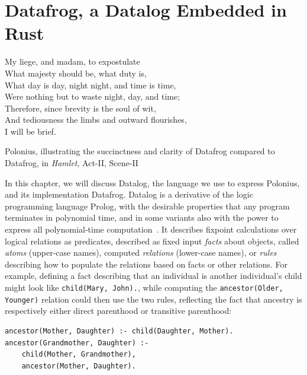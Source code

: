 \documentclass[11pt,a4paper,twoside,openany,draft]{report}
\newcommand{\InDatalog}[1]{\texttt{#1}}
\begin{document}
\chapter{Datafrog, a Datalog Embedded in Rust}\label{cha:datalog}

\epigraph{My liege, and madam, to expostulate\\
  What majesty should be, what duty is,\\
  What day is day, night night, and time is time,\\
  Were nothing but to waste night, day, and time;\\
  Therefore, since brevity is the soul of wit,\\
  And tediousness the limbs and outward flourishes,\\
  I will be brief.}{Polonius, illustrating the succinctness and clarity of
  Datafrog compared to Datafrog, in \textit{Hamlet}, Act-II, Scene-II}

In this chapter, we will discuss Datalog, the language we use to express
Polonius, and its implementation Datafrog. Datalog is a derivative of the logic
programming language Prolog, with the desirable properties that any program
terminates in polynomial time, and in some variants also with the power to
express all polynomial-time computation~\cite{afrati_datalog_1995}. It describes
fixpoint calculations over logical relations as predicates, described as fixed
input \emph{facts} about objects, called \emph{atoms} (upper-case names),
computed \emph{relations} (lower-case names), or \emph{rules} describing how to
populate the relations based on facts or other relations. For example, defining
a fact describing that an individual is another individual's child might look
like \InDatalog{child(Mary, John).}, while computing the
\InDatalog{ancestor(Older, Younger)} relation could then use the two rules,
reflecting the fact that ancestry is respectively either direct parenthood or
transitive parenthood:
\begin{verbatim}
ancestor(Mother, Daughter) :- child(Daughter, Mother).
ancestor(Grandmother, Daughter) :- 
    child(Mother, Grandmother),
    ancestor(Mother, Daughter).
\end{verbatim}
\end{document}
